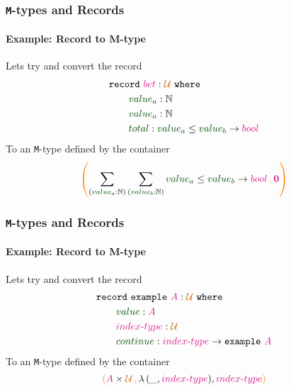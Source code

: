 \documentclass[xelatex,mathserif,serif,notheorems]{beamer} %
\theoremstyle{plain} %
\theoremstyle{definition}
\theoremstyle{remark}
\newcommand*{\term}[1]{\textcolor{green!30!black}{#1}} %
\newcommand*{\type}[1]{\textcolor{magenta!90!black}{#1}}
\newcommand*{\containerpair}[2]{\ensuremath{\colorlet{savedleftcolor}{.}\color{orange}\left(\color{savedleftcolor}#1\,\textcolor{orange}{\mathbf{,}}\,#2\color{orange}\right)\color{savedleftcolor}}}
\newcommand*{\universe}[1]{\textcolor{orange!80!black}{#1}}
\newcommand*{\empt}{\type{\textbf{0}}}
\newcommand*{\typeformer}[1]{\ensuremath{\mathtt{#1}}}
\begin{document}
\begin{frame}
  \frametitle{\texttt{M}-types and Records}
  \framesubtitle{Example: Record to M-type}
  Lets try and convert the record
  \begin{equation}
    \begin{aligned}
      &\mathtt{record}~\type{bet} : \universe{\mathcal{U} }~\mathtt{where} \\
      &\qquad \term{value_a} : \mathbb{N} \\
      &\qquad \term{value_a} : \mathbb{N} \\
      &\qquad \term{total} : \term{value_a} \leq \term{value_b} \rightarrow \type{bool} \\
    \end{aligned}
  \end{equation}
  To an \texttt{M}-type defined by the container
  \begin{equation}
    \containerpair{\sum_{(\term{value_a} : \mathbb{N})} \sum_{(\term{value_b} : \mathbb{N})} \term{value_a} \leq \term{value_b} \rightarrow \type{bool}}{\empt}
  \end{equation}
\end{frame}


\begin{frame}
  \frametitle{\texttt{M}-types and Records}
  \framesubtitle{Example: Record to M-type}
  Lets try and convert the record
  \begin{equation}
    \begin{aligned}
      &\mathtt{record}~\typeformer{example}~\type{A} : \universe{\mathcal{U} }~\mathtt{where} \\
      &\qquad \term{value} : \type{A} \\
      &\qquad \type{index\text{-}type} : \universe{\mathcal{U}} \\
      &\qquad \term{continue} : \type{index\text{-}type} \rightarrow \typeformer{example}~\type{A} \\
    \end{aligned}
  \end{equation}
  To an \texttt{M}-type defined by the container
  \begin{equation}
    \containerpair{\type{A} \times \universe{\mathcal{U}}}{\lambda\,(\_,\type{index\text{-}type}), \type{index\text{-}type}}
  \end{equation}
\end{frame}
\end{document}
